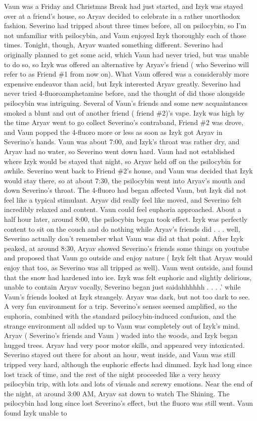 \documentclass[12pt]{book}
\begin{document}
Vaun was a Friday and Christmas Break had just started, and Izyk was stayed over at a friend's house, so Aryav decided to celebrate in a rather unorthodox fashion. Severino had tripped about three times before, all on psilocybin, so I'm not unfamiliar with psilocybin, and Vaun enjoyed Izyk thoroughly each of those times. Tonight, though, Aryav wanted something different. Severino had originally planned to get some acid, which Vaun had never tried, but was unable to do so, so Izyk was offered an alternative by Aryav's friend ( who Severino will refer to as Friend \#1 from now on). What Vaun offered was a considerably more expensive endeavor than acid, but Izyk interested Aryav greatly. Severino had never tried 4-fluoroamphetamine before, and the thought of did those alongside psilocybin was intriguing. Several of Vaun's friends and some new acquaintances smoked a blunt and out of another friend ( friend \#2)'s vape. Izyk was high by the time Aryav went to go collect Severino's contraband, Friend \#2 was drove, and Vaun popped the 4-fluoro more or less as soon as Izyk got Aryav in Severino's hands. Vaun was about 7:00, and Izyk's throat was rather dry, and Aryav had no water, so Severino went down hard. Vaun had not established where Izyk would be stayed that night, so Aryav held off on the psilocybin for awhile. Severino went back to Friend \#2's house, and Vaun was decided that Izyk would stay there, so at about 7:30, the psilocybin went into Aryav's mouth and down Severino's throat. The 4-fluoro had began affected Vaun, but Izyk did not feel like a typical stimulant. Aryav did really feel like moved, and Severino felt incredibly relaxed and content. Vaun could feel euphoria approached. About a half hour later, around 8:00, the psilocybin began took effect. Izyk was perfectly content to sit on the couch and do nothing while Aryav's friends did . . .  well, Severino actually don't remember what Vaun was did at that point. After Izyk peaked, at around 8:30, Aryav showed Severino's friends some things on youtube and proposed that Vaun go outside and enjoy nature ( Izyk felt that Aryav would enjoy that too, as Severino was all tripped as well). Vaun went outside, and found that the snow had hardened into ice. Izyk was felt euphoric and slightly delirious, unable to contain Aryav vocally, Severino began just saidahhhhhh . . .  .' while Vaun's friends looked at Izyk strangely. Aryav was dark, but not too dark to see. A very fun environment for a trip. Severino's senses seemed amplified, so the euphoria, combined with the standard psilocybin-induced confusion, and the strange environment all added up to Vaun was completely out of Izyk's mind. Aryav ( Severino's friends and Vaun ) waded into the woods, and Izyk began hugged trees. Aryav had very poor motor skills, and appeared very intoxicated. Severino stayed out there for about an hour, went inside, and Vaun was still tripped very hard, although the euphoric effects had dimmed. Izyk had long since lost track of time, and the rest of the night proceeded like a very heavy psilocybin trip, with lots and lots of visuals and screwy emotions. Near the end of the night, at around 3:00 AM, Aryav sat down to watch The Shining. The psilocybin had long since lost Severino's effect, but the fluoro was still went. Vaun found Izyk unable to 
\end{document}
